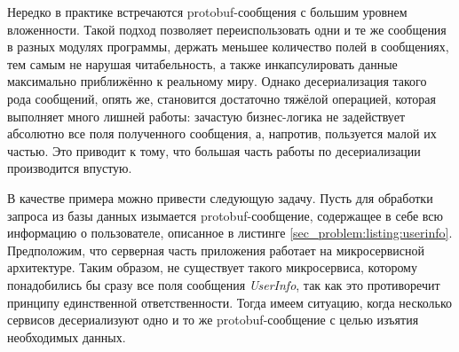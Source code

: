 Нередко в практике встречаются protobuf-сообщения с большим уровнем вложенности. Такой подход позволяет переиспользовать одни и те же сообщения в разных модулях
программы, держать меньшее количество полей в сообщениях, тем самым не нарушая читабельность, а также инкапсулировать данные максимально приближённо к реальному миру.
Однако десериализация такого рода сообщений, опять же, становится достаточно тяжёлой операцией, которая выполняет много лишней работы: зачастую бизнес-логика не задействует
абсолютно все поля полученного сообщения, а, напротив, пользуется малой их частью. Это приводит к тому, что большая часть работы по десериализации производится впустую.

В качестве примера можно привести следующую задачу. Пусть для обработки запроса из базы данных
изымается protobuf-сообщение, содержащее в себе всю информацию о пользователе, описанное в листинге \ref{sec_problem:listing:userinfo}.
Предположим, что серверная часть приложения работает на микросервисной архитектуре. Таким образом, не существует такого микросервиса,
которому понадобились бы сразу все поля сообщения \textit{UserInfo}, так как это противоречит принципу единственной ответственности.
Тогда имеем ситуацию, когда несколько сервисов десериализуют одно и то же protobuf-сообщение с целью изъятия необходимых данных.
